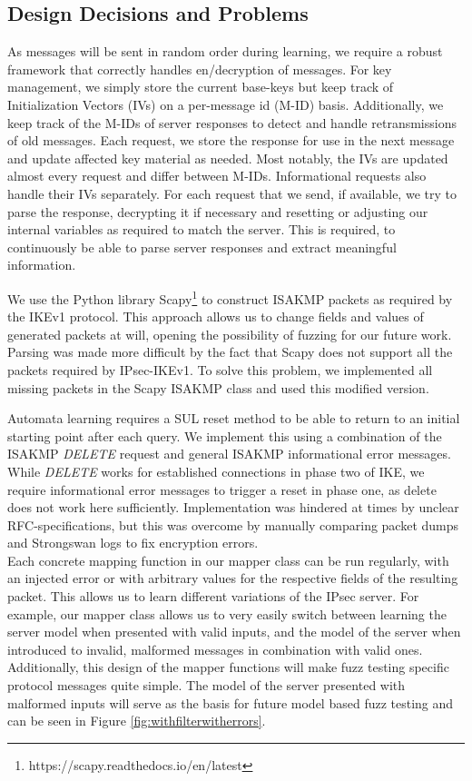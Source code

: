 \subsection{Design Decisions and Problems}

As messages will be sent in random order during learning, we require a robust framework that correctly handles en/decryption of messages. For key management, we simply store the current base-keys but keep track of Initialization Vectors (IVs) on a per-message id (M-ID) basis. Additionally, we keep track of the M-IDs of server responses to detect and handle retransmissions of old messages. Each request, we store the response for use in the next message and update affected key material as needed. Most notably, the IVs are updated almost every request and differ between M-IDs. Informational requests also handle their IVs separately. For each request that we send, if available, we try to parse the response, decrypting it if necessary and resetting or adjusting our internal variables as required to match the server. This is required, to continuously be able to parse server responses and extract meaningful information.

We use the Python library Scapy\footnote{https://scapy.readthedocs.io/en/latest} to construct ISAKMP packets as required by the IKEv1 protocol. This approach allows us to change fields and values of generated packets at will, opening the possibility of fuzzing for our future work. Parsing was made more difficult by the fact that Scapy does not support all the packets required by IPsec-IKEv1. To solve this problem, we implemented all missing packets in the Scapy ISAKMP class and used this modified version.

Automata learning requires a SUL reset method to be able to return to an initial starting point after each query. We implement this using a combination of the ISAKMP \emph{DELETE} request and general ISAKMP informational error messages. While \emph{DELETE} works for established connections in phase two of IKE, we require informational error messages to trigger a reset in phase one, as delete does not work here sufficiently. Implementation was hindered at times by unclear RFC-specifications, but this was overcome by manually comparing packet dumps and Strongswan logs to fix encryption errors.\\

Each concrete mapping function in our mapper class can be run regularly, with an injected error or with arbitrary values for the respective fields of the resulting packet. This allows us to learn different variations of the IPsec server. For example, our mapper class allows us to very easily switch between learning the server model when presented with valid inputs, and the model of the server when introduced to invalid, malformed messages in combination with valid ones. Additionally, this design of the mapper functions will make fuzz testing specific protocol messages quite simple. The model of the server presented with malformed inputs will serve as the basis for future model based fuzz testing and can be seen in Figure \ref{fig:withfilterwitherrors}.


